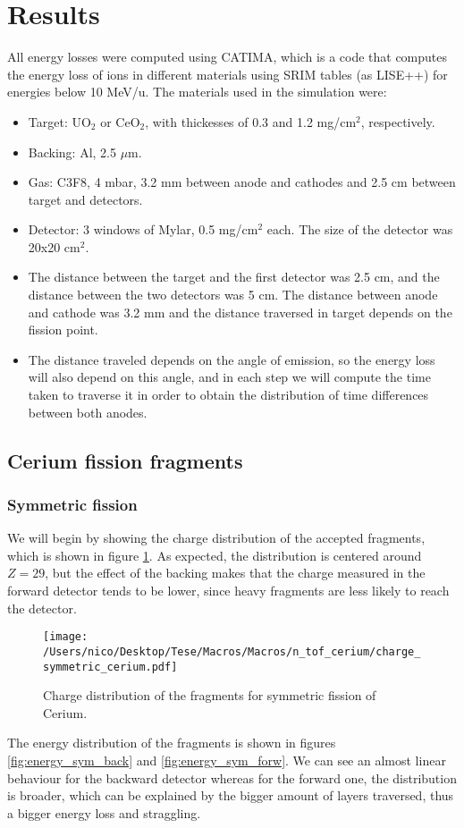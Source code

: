 \documentclass{article}
\begin{document}
\section{Results}
All energy losses were computed using CATIMA, which is a code that computes the energy loss of ions in different materials using SRIM tables (as LISE++) \cite{Ziegler} for energies below 10 MeV/u. 
The materials used in the simulation were:
\begin{itemize}
\item Target: UO$_2$ or CeO$_2$, with thickesses of 0.3 and 1.2 mg/cm$^2$, respectively.
\item Backing: Al, 2.5 $\mu$m.
\item Gas: C3F8, 4 mbar, 3.2 mm between anode and cathodes and 2.5 cm between target and detectors.
\item Detector: 3 windows of Mylar, 0.5 mg/cm$^2$ each. The size of the detector was 20x20 cm$^2$.
\item The distance between the target and the first detector was 2.5 cm, and the distance between the two detectors was 5 cm. The distance between anode and cathode was 3.2 mm and the distance traversed in target depends on the fission point.
\item The distance traveled depends on the angle of emission, so the energy loss will also depend on this angle, and in each step we will compute the time taken to traverse it in order to obtain the distribution of time differences between both anodes.
\end{itemize}

\subsection {Cerium fission fragments}

\subsubsection*{Symmetric fission}
We will begin by showing the charge distribution of the accepted fragments, which is shown in figure \ref{fig:charge_sym}. As expected, the distribution is centered around $Z=29$, but the effect of the backing makes that the charge measured in the forward detector tends to be lower, since heavy fragments are less likely to reach the detector.
\begin{figure}[H]
    \centering
    \texttt{[image: /Users/nico/Desktop/Tese/Macros/Macros/n\_tof\_cerium/charge\_symmetric\_cerium.pdf]}
    \caption{Charge distribution of the fragments for symmetric fission of Cerium.}
    \label{fig:charge_sym}
\end{figure}
The energy distribution of the fragments is shown in figures \ref{fig:energy_sym_back} and \ref{fig:energy_sym_forw}. We can see an almost linear behaviour for the backward detector whereas for the forward one, the distribution is broader, which can be explained by the bigger amount of layers traversed, thus a bigger energy loss and straggling.
\end{document}
